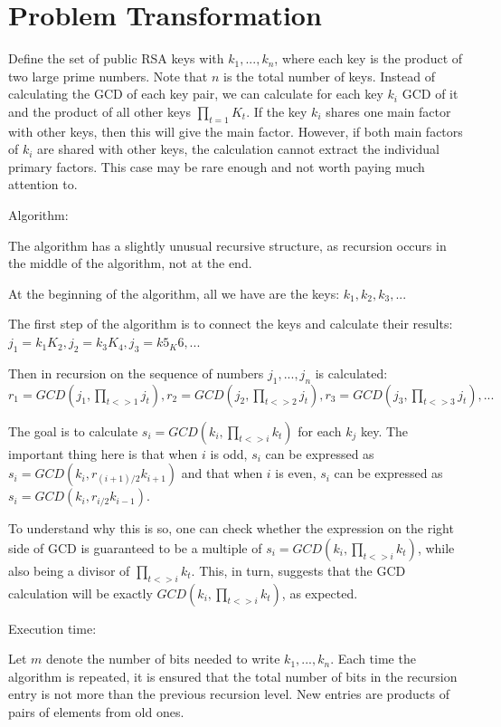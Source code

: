 \documentclass[runningheads]{llncs}
\begin{document}
\section{Problem Transformation}
\label{sec:4}

Define the set of public RSA keys with $k_1, ... , k_n$, where each key is the product of two large prime numbers. Note that $n$ is the total number of keys. Instead of calculating the GCD of each key pair, we can calculate for each key $k_i$ GCD of it and the product of all other keys $\prod_{t=1} K_t$. If the key $k_i$ shares one main factor with other keys, then this will give the main factor. However, if both main factors of $k_i$ are shared with other keys, the calculation cannot extract the individual primary factors. This case may be rare enough and not worth paying much attention to. 

Algorithm:

The algorithm has a slightly unusual recursive structure, as recursion occurs in the middle of the algorithm, not at the end.

At the beginning of the algorithm, all we have are the keys: $k_1, k_2, k_3, ...$

The first step of the algorithm is to connect the keys and calculate their results: $j_1=k_1K_2, j_2=k_3K_4, j_3=k5_K6, ...$

Then in recursion on the sequence of numbers $j_1, ..., j_n$ is calculated: $r_1 = GCD(j_1,\prod_{t<>1}j_t), r_2 = GCD(j_2,\prod_{t<>2}j_t), r_3 = GCD(j_3,\prod_{t<>3}j_t), ...$

The goal is to calculate $s_i = GCD (k_i, \prod_{t<>i} k_t)$ for each $k_j$ key. The important thing here is that when $i$ is odd, $s_i$ can be expressed as $s_i = GCD (k_i, r_{(i + 1)/2} k_{i+1})$ and that when $i$ is even, $s_i$ can be expressed as $s_i = GCD (k_i, r_{i/2} k_{i-1})$. 

To understand why this is so, one can check whether the expression on the right side of GCD is guaranteed to be a multiple of $s_i = GCD (k_i, \prod_{t<>i} k_t)$, while also being a divisor of $\prod_{t<>i} k_t$. This, in turn, suggests that the GCD calculation will be exactly $GCD(k_i, \prod_{t<>i} k_t)$, as expected.

Execution time:

Let $m$ denote the number of bits needed to write $k_1, ..., k_n$. Each time the algorithm is repeated, it is ensured that the total number of bits in the recursion entry is not more than the previous recursion level. New entries are products of pairs of elements from old ones.
\end{document}
